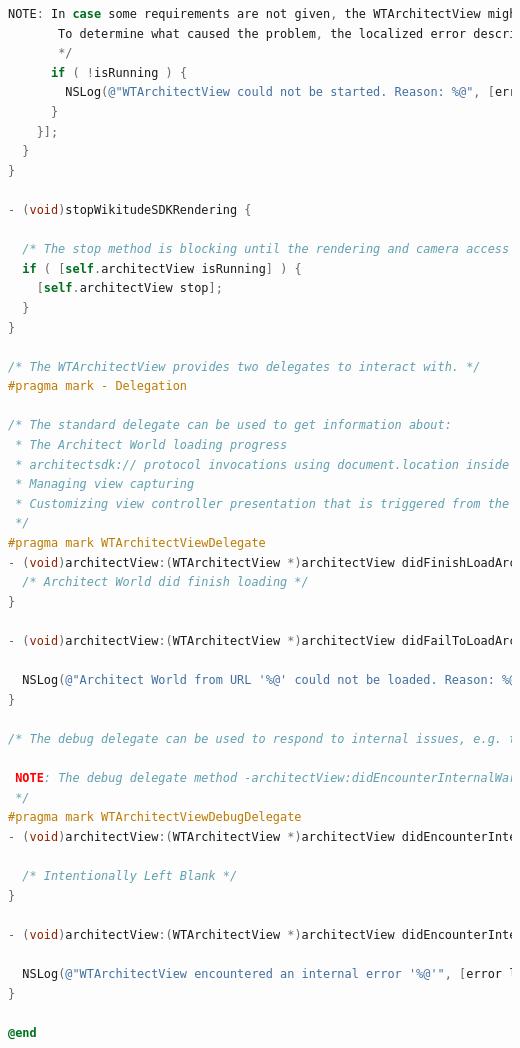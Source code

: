 \documentclass[thesis=M,english]{FITthesis}[2012/10/20]
\begin{document}
\begin{lstlisting}[language=C]
       NOTE: In case some requirements are not given, the WTArchitectView might not be started and returns NO for isRunning.
       To determine what caused the problem, the localized error description can be used.
       */
      if ( !isRunning ) {
        NSLog(@"WTArchitectView could not be started. Reason: %@", [error localizedDescription]);
      }
    }];
  }
}

- (void)stopWikitudeSDKRendering {
  
  /* The stop method is blocking until the rendering and camera access is stopped */
  if ( [self.architectView isRunning] ) {
    [self.architectView stop];
  }
}

/* The WTArchitectView provides two delegates to interact with. */
#pragma mark - Delegation

/* The standard delegate can be used to get information about:
 * The Architect World loading progress
 * architectsdk:// protocol invocations using document.location inside JavaScript
 * Managing view capturing
 * Customizing view controller presentation that is triggered from the WTArchitectView
 */
#pragma mark WTArchitectViewDelegate
- (void)architectView:(WTArchitectView *)architectView didFinishLoadArchitectWorldNavigation:(WTNavigation *)navigation {
  /* Architect World did finish loading */
}

- (void)architectView:(WTArchitectView *)architectView didFailToLoadArchitectWorldNavigation:(WTNavigation *)navigation withError:(NSError *)error {
  
  NSLog(@"Architect World from URL '%@' could not be loaded. Reason: %@", navigation.originalURL, [error localizedDescription]);
}

/* The debug delegate can be used to respond to internal issues, e.g. the user declined camera or GPS access.
 
 NOTE: The debug delegate method -architectView:didEncounterInternalWarning is currently not used.
 */
#pragma mark WTArchitectViewDebugDelegate
- (void)architectView:(WTArchitectView *)architectView didEncounterInternalWarning:(WTWarning *)warning {
  
  /* Intentionally Left Blank */
}

- (void)architectView:(WTArchitectView *)architectView didEncounterInternalError:(NSError *)error {
  
  NSLog(@"WTArchitectView encountered an internal error '%@'", [error localizedDescription]);
}

@end
\end{lstlisting}
\end{document}
